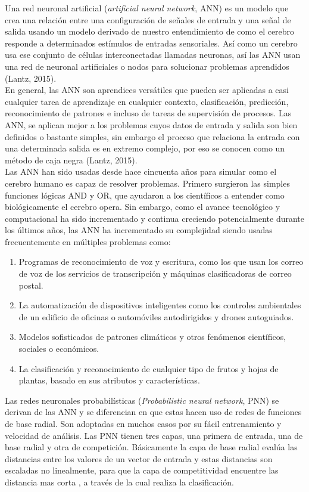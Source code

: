 Una red neuronal artificial (\textit{artificial neural network}, ANN) es un modelo que crea una relación entre una configuración de señales de entrada y una señal de salida usando un modelo derivado de nuestro entendimiento de como el cerebro responde a determinados estímulos de entradas sensoriales. Así como un cerebro usa ese conjunto de células interconectadas llamadas neuronas, así las ANN usan una red de neuronal artificiales o nodos para solucionar problemas aprendidos (Lantz, 2015).\\

En general, las ANN son aprendices versátiles que pueden ser aplicadas a casi cualquier tarea de aprendizaje en cualquier contexto, clasificación, predicción, reconocimiento de patrones e incluso  de tareas de supervisión de procesos. Las ANN, se aplican mejor a los problemas cuyos datos de entrada y salida son bien definidos o bastante simples, sin embargo el proceso que relaciona la entrada con una determinada salida es en extremo complejo, por eso se conocen como un método de caja negra (Lantz, 2015).\\

Las ANN han sido usadas desde hace cincuenta años para simular como el cerebro humano es capaz de resolver problemas. Primero surgieron las simples funciones lógicas AND y OR, que ayudaron a los científicos a entender como biológicamente el cerebro opera. Sin embargo, como el avance tecnológico y computacional ha sido incrementado y continua creciendo potencialmente durante los últimos años, las ANN ha incrementado su complejidad siendo usadas frecuentemente en múltiples problemas como:

\begin{enumerate}
    \item{Programas de reconocimiento de voz y escritura, como los que usan los correo de voz
de los servicios de transcripción y máquinas clasificadoras de correo postal.}
	\item{La automatización de dispositivos inteligentes como los controles ambientales de un edificio de oficinas o automóviles autodirigidos y drones autoguiados.}
	\item{Modelos sofisticados de patrones climáticos y otros fenómenos científicos, sociales o económicos.}
	\item{La clasificaci\'on y reconocimiento de cualquier tipo de frutos y hojas de plantas, basado en sus atributos y características.}
\end{enumerate} 

Las redes neuronales probabilísticas  (\textit{Probabilistic neural network}, PNN) se derivan de las ANN y se diferencian en que estas hacen uso de redes de funciones de base radial. Son adoptadas en muchos casos por su fácil entrenamiento y velocidad de análisis. Las PNN tienen tres capas, una primera de entrada, una de base radial y otra de competición. Básicamente la capa de base radial evalúa las distancias entre los valores de un vector de entrada y estas distancias son escaladas no linealmente, para que la capa de competitividad encuentre las distancia mas corta , a través de la cual realiza la clasificación.\\

